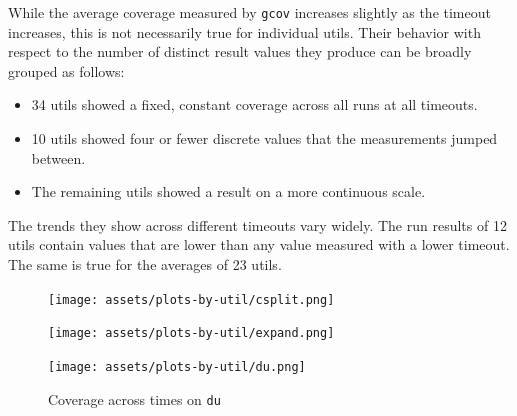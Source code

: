\documentclass{article}
\begin{document}
While the average coverage measured by \lstinline{gcov} increases slightly as the timeout increases, this is not necessarily true for individual utils. Their behavior with respect to the number of distinct result values they produce can be broadly grouped as follows:

\begin{itemize}
    \item 34 utils showed a fixed, constant coverage across all runs at all timeouts.
    \item 10 utils showed four or fewer discrete values that the measurements jumped between.
    \item The remaining utils showed a result on a more continuous scale.
\end{itemize}

The trends they show across different timeouts vary widely. The run results of 12 utils contain values that are lower than any value measured with a lower timeout. The same is true for the averages of 23 utils.

\begin{figure}[htbp]
    \centering
    \begin{minipage}[b]{0.3\linewidth}
        \texttt{[image: assets/plots-by-util/csplit.png]}
        \captionsetup{width=0.9\linewidth}
        \caption{Coverage across times on \lstinline{csplit}}
        \label{fig:cov_csplit}
    \end{minipage}
    \hfill
    \begin{minipage}[b]{0.3\linewidth}
        \texttt{[image: assets/plots-by-util/expand.png]}
        \captionsetup{width=0.9\linewidth}
        \caption{Coverage across times on \lstinline{expand}}
        \label{fig:cov_expand}
    \end{minipage}
    \hfill
    \begin{minipage}[b]{0.3\linewidth}
        \texttt{[image: assets/plots-by-util/du.png]}
        \captionsetup{width=0.9\linewidth}
        \caption{Coverage across times on \lstinline{du}}
        \label{fig:cov_du}
    \end{minipage}
\end{figure}
\end{document}
